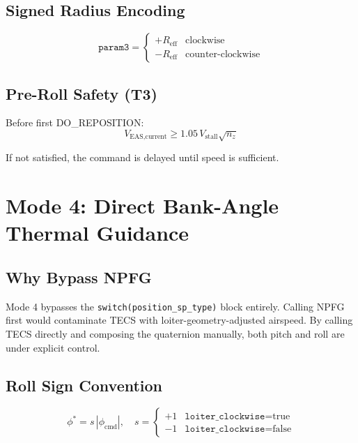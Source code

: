 \documentclass[12pt,a4paper]{report}
\begin{document}
\subsection{Signed Radius Encoding}

\begin{equation}
  \texttt{param3} = \begin{cases}
    +R_{\text{eff}} & \text{clockwise} \\
    -R_{\text{eff}} & \text{counter-clockwise}
  \end{cases}
\end{equation}

\subsection{Pre-Roll Safety (T3)}

Before first DO\_REPOSITION:
\begin{equation}
  V_{\text{EAS,current}} \geq 1.05\,V_{\text{stall}}\sqrt{n_z}
\end{equation}

If not satisfied, the command is delayed until speed is sufficient.

\section{Mode 4: Direct Bank-Angle Thermal Guidance}

\subsection{Why Bypass NPFG}

Mode 4 bypasses the \texttt{switch(position\_sp\_type)} block entirely.
Calling NPFG first would contaminate TECS with loiter-geometry-adjusted
airspeed. By calling TECS directly and composing the quaternion manually,
both pitch and roll are under explicit control.

\subsection{Roll Sign Convention}

\begin{equation}
  \phi^* = s\,|\phi_{\text{cmd}}|, \quad
  s = \begin{cases}
    +1 & \texttt{loiter\_clockwise} = \text{true} \\
    -1 & \texttt{loiter\_clockwise} = \text{false}
  \end{cases}
\end{equation}
\end{document}

